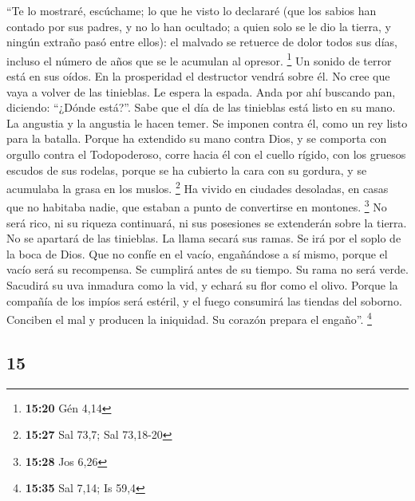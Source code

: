 \begin{paracol}{2}
 ``Te lo mostraré, escúchame; lo que he visto lo
declararé  (que los sabios han contado por sus padres, y
no lo han ocultado;  a quien solo se le dio la tierra, y
ningún extraño pasó entre ellos):  el malvado se retuerce
de dolor todos sus días, incluso el número de años que se le acumulan al
opresor. \footnote{\textbf{15:20} Gén 4,14}  Un sonido de
terror está en sus oídos. En la prosperidad el destructor vendrá sobre
él.  No cree que vaya a volver de las tinieblas. Le
espera la espada.  Anda por ahí buscando pan, diciendo:
``¿Dónde está?''. Sabe que el día de las tinieblas está listo en su
mano.  La angustia y la angustia le hacen temer. Se
imponen contra él, como un rey listo para la batalla. 
Porque ha extendido su mano contra Dios, y se comporta con orgullo
contra el Todopoderoso,  corre hacia él con el cuello
rígido, con los gruesos escudos de sus rodelas,  porque
se ha cubierto la cara con su gordura, y se acumulaba la grasa en los
muslos. \footnote{\textbf{15:27} Sal 73,7; Sal 73,18-20} 
Ha vivido en ciudades desoladas, en casas que no habitaba nadie, que
estaban a punto de convertirse en montones. \footnote{\textbf{15:28} Jos
  6,26}  No será rico, ni su riqueza continuará, ni sus
posesiones se extenderán sobre la tierra.  No se apartará
de las tinieblas. La llama secará sus ramas. Se irá por el soplo de la
boca de Dios.  Que no confíe en el vacío, engañándose a
sí mismo, porque el vacío será su recompensa.  Se
cumplirá antes de su tiempo. Su rama no será verde. 
Sacudirá su uva inmadura como la vid, y echará su flor como el olivo.
 Porque la compañía de los impíos será estéril, y el
fuego consumirá las tiendas del soborno.  Conciben el mal
y producen la iniquidad. Su corazón prepara el engaño''. \footnote{\textbf{15:35}
  Sal 7,14; Is 59,4}

\switchcolumn
\begin{otherlanguage}{english}

\hypertarget{section-29}{%
\section{15}\label{section-29}}


\end{otherlanguage}
\end{paracol}
